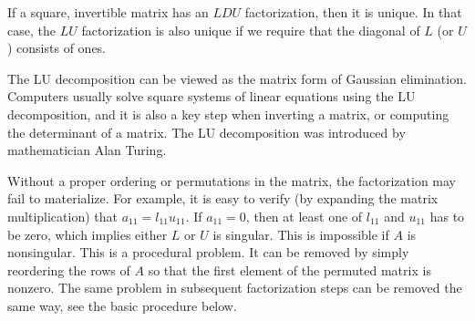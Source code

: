 If a square, invertible matrix has an $LDU$ factorization, then it is unique. 
In that case, the $LU$ factorization is also unique if we require that the 
diagonal of $L$ (or $U$ ) consists of ones.

The LU decomposition can be viewed as the matrix form of Gaussian elimination. 
Computers usually solve square systems of linear equations using the LU 
decomposition, and it is also a key step when inverting a matrix, or 
computing the determinant of a matrix. The LU decomposition was introduced
by mathematician Alan Turing.

Without a proper ordering or permutations in the matrix, 
the factorization may fail to materialize. For example, it is easy to verify 
(by expanding the matrix multiplication) that $a_{11} = l_{11} u_{11}$. 
If $a_{11} = 0$, then at least one of $l_{11}$ and $u_{11}$ has to be zero, 
which implies either $L$ or $U$ is singular. This is impossible if $A$ is 
nonsingular. This is a procedural problem. It can be removed by simply 
reordering the rows of $A$ so that the first element of the permuted matrix is 
nonzero. The same problem in subsequent factorization steps can be removed the 
same way, see the basic procedure below.

